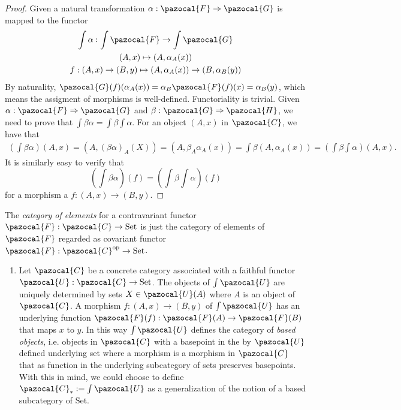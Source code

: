 \begin{proof}
    Given a natural transformation $\alpha: \pazocal{F}\Rightarrow \pazocal{G}$ is mapped to the functor 
    \begin{gather*}
        \int \alpha: \int\pazocal{F} \rightarrow \int \pazocal{G}\\
        (A,x) \mapsto (A, \alpha_A(x))\\
        f : (A,x)\rightarrow (B,y) \mapsto (A, \alpha_A(x)) \rightarrow (B,\alpha_B(y))
    \end{gather*}
    By naturality,
    $\pazocal{G}(f)(\alpha_A(x))= \alpha_B\pazocal{F}(f)(x)= \alpha_B(y)$, which means the assigment of morphisms is well-defined. Functoriality is trivial. Given $\alpha: \pazocal{F}\Rightarrow \pazocal{G}$ and $\beta : \pazocal{G}\Rightarrow \pazocal{H}$, we need to prove that $\int \beta\alpha = \int \beta\int \alpha$. For an object $(A,x)$ in $\pazocal{C}$, we have that 
    \begin{align*}
        \left(\int \beta \alpha\right)(A,x) = (A,(\beta\alpha)_A(X))=(A,\beta_A\alpha_A(x)) =\int \beta(A,\alpha_A(x)) = \left(\int\beta\int\alpha\right) (A,x). 
    \end{align*}
    It is similarly easy to verify that 
    $$\left(\int\beta\alpha\right)(f)=\left(\int\beta\int \alpha\right)(f)$$
    for a morphism a $f: (A,x)\rightarrow (B,y)$.
\end{proof}
\begin{definition}
    The \emph{category of elements} for a contravariant functor $\pazocal{F}:\pazocal{C}\rightarrow \mathrm{Set}$ is just the category of elements of $\pazocal{F}$ regarded as covariant functor $\pazocal{F} :\pazocal{C}\op\rightarrow \mathrm{Set}$.
\end{definition}
\begin{example}
    \begin{enumerate}
        \item Let $\pazocal{C}$ be a concrete category associated with a faithful functor $\pazocal{U} : \pazocal{C}\rightarrow \mathrm{Set}$. The objects of $\int \pazocal{U}$ are uniquely determined by sets $X\in \pazocal{U}(A)$ where $A$ is an object of $\pazocal{C}$. A morphism $f: (A,x)\rightarrow(B,y)$ of $\int \pazocal{U}$ has an underlying function $\pazocal{F}(f) : \pazocal{F}(A)\rightarrow \pazocal{F}(B)$ that maps $x$ to $y$. In this way $\int\pazocal{U}$ defines the category of \emph{based objects}, i.e. objects in $\pazocal{C}$ with a basepoint in the by $\pazocal{U}$ defined underlying set where a morphism is a morphism in $\pazocal{C}$ that as function in the underlying subcategory of sets preserves basepoints. With this in mind, we could choose to define $\pazocal{C}_\ast := \int \pazocal{U}$ as a generalization of the notion of a based subcategory of $\mathrm{Set}$.   
    \end{enumerate}
\end{example}
